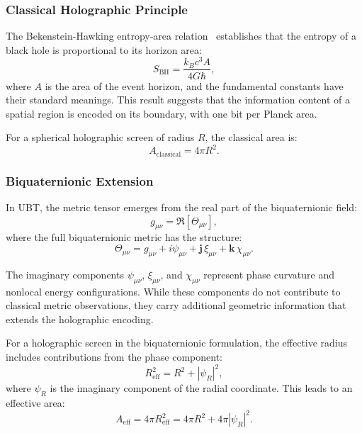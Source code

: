 \subsubsection{Classical Holographic Principle}

The Bekenstein-Hawking entropy-area relation~\cite{Bekenstein1973,Hawking1975} establishes that the entropy of a black hole is proportional to its horizon area:
\begin{equation}
S_{\text{BH}} = \frac{k_B c^3 A}{4 G \hbar},
\label{eq:bekenstein_hawking}
\end{equation}
where $A$ is the area of the event horizon, and the fundamental constants have their standard meanings. This result suggests that the information content of a spatial region is encoded on its boundary, with one bit per Planck area.

For a spherical holographic screen of radius $R$, the classical area is:
\begin{equation}
A_{\text{classical}} = 4\pi R^2.
\end{equation}

\subsubsection{Biquaternionic Extension}

In UBT, the metric tensor emerges from the real part of the biquaternionic field:
\begin{equation}
g_{\mu\nu} = \Re[\Theta_{\mu\nu}],
\end{equation}
where the full biquaternionic metric has the structure:
\begin{equation}
\Theta_{\mu\nu} = g_{\mu\nu} + i\psi_{\mu\nu} + \mathbf{j}\,\xi_{\mu\nu} + \mathbf{k}\,\chi_{\mu\nu}.
\end{equation}

The imaginary components $\psi_{\mu\nu}$, $\xi_{\mu\nu}$, and $\chi_{\mu\nu}$ represent phase curvature and nonlocal energy configurations. While these components do not contribute to classical metric observations, they carry additional geometric information that extends the holographic encoding.

For a holographic screen in the biquaternionic formulation, the effective radius includes contributions from the phase component:
\begin{equation}
R_{\text{eff}}^2 = R^2 + |\psi_R|^2,
\end{equation}
where $\psi_R$ is the imaginary component of the radial coordinate. This leads to an effective area:
\begin{equation}
A_{\text{eff}} = 4\pi R_{\text{eff}}^2 = 4\pi R^2 + 4\pi |\psi_R|^2.
\label{eq:effective_area}
\end{equation}

